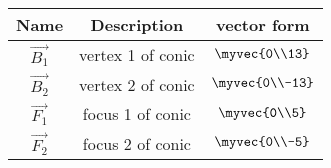 \begin{tabular}{|c|c|c|}
\hline
\textbf{Name} & \textbf{Description} & \textbf{vector form} \\
\hline
$\vec{B_1}$ & vertex 1 of conic & $\myvec{0\\13}$ \\ \hline
$\vec{B_2}$ & vertex 2 of conic & $\myvec{0\\-13}$ \\ \hline
$\vec{F_1}$ & focus 1 of conic & $\myvec{0\\5}$ \\ \hline
$\vec{F_2}$ & focus 2 of conic & $\myvec{0\\-5}$ \\ \hline
\end{tabular}
